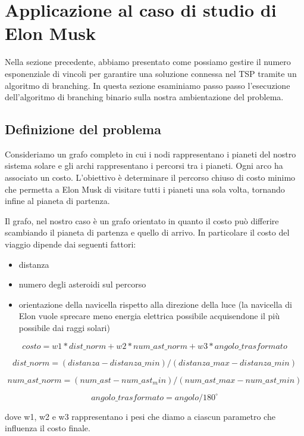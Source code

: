 


\newpage
\section{Applicazione al caso di studio di Elon Musk}
Nella sezione precedente, abbiamo presentato come possiamo gestire il numero esponenziale di vincoli per garantire una soluzione connessa nel TSP tramite un algoritmo di branching. In questa sezione esaminiamo passo passo l’esecuzione dell'algoritmo di branching binario sulla nostra ambientazione del problema.

\subsection{Definizione del problema}

Consideriamo un grafo completo in cui i nodi rappresentano i pianeti del nostro sistema solare e gli archi rappresentano i percorsi tra i pianeti. Ogni arco ha associato un costo. L'obiettivo è determinare il percorso chiuso di costo minimo che permetta a Elon Musk di visitare tutti i pianeti una sola volta, tornando infine al pianeta di partenza.

Il grafo, nel nostro caso è un grafo orientato in quanto il costo può differire scambiando il pianeta di partenza e quello di arrivo. In particolare il costo del viaggio dipende dai seguenti fattori:

\begin{itemize}
    \item distanza
    \item numero degli asteroidi sul percorso
    \item orientazione della navicella rispetto alla direzione della luce (la navicella di Elon vuole sprecare meno energia elettrica possibile acquisendone il più possibile dai raggi solari)
\end{itemize}

\[
costo = w1 * dist\_norm + w2 * num\_ast\_norm + w3 * angolo\_trasformato 
\]

\[
dist\_norm = (distanza - distanza\_min) / (distanza\_max - distanza\_min)
\]

\[
num\_ast\_norm = (num\_ast - num\_ast_min) / (num\_ast\_max - num\_ast\_min)
\]

\[
angolo\_trasformato = angolo / 180^{\circ}
\]

dove w1, w2 e w3 rappresentano i pesi che diamo a ciascun parametro che influenza il costo finale.


